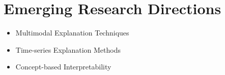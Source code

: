 \section{Emerging Research Directions}
\begin{itemize}
    \item Multimodal Explanation Techniques
    \item Time-series Explanation Methods
    \item Concept-based Interpretability
\end{itemize}

